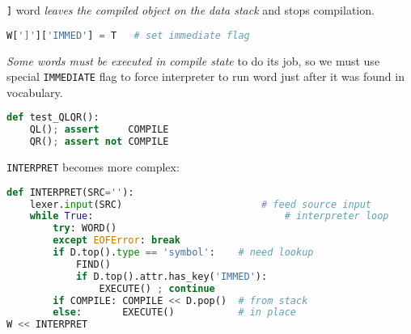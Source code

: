 \verb|]| word  \emph{leaves the compiled object on the data stack} and stops
compilation.
\begin{lstlisting}[language=Python]
W[']']['IMMED'] = T   # set immediate flag
\end{lstlisting}
\emph{Some words must be executed in compile state} to do its job, so we must
use special \verb|IMMEDIATE| flag to force interpreter to run word just after it
was found in vocabulary.
\begin{lstlisting}[language=Python]
def test_QLQR():
	QL(); assert     COMPILE
	QR(); assert not COMPILE
\end{lstlisting}
\clearpage\noindent
\verb|INTERPRET| becomes more complex:
\begin{lstlisting}[language=Python]
def INTERPRET(SRC=''):
	lexer.input(SRC)						# feed source input
	while True:									# interpreter loop                     
		try: WORD()
		except EOFError: break
		if D.top().type == 'symbol':    # need lookup
			FIND()
			if D.top().attr.has_key('IMMED'):
				EXECUTE() ; continue
		if COMPILE: COMPILE << D.pop()  # from stack
		else:       EXECUTE()           # in place
W << INTERPRET
\end{lstlisting}
